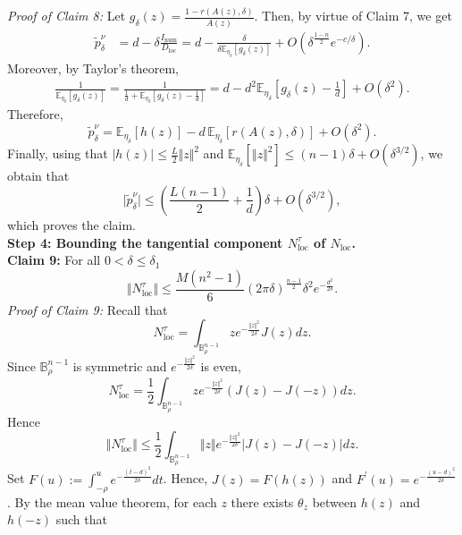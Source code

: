 \documentclass[11pt]{amsart}
\newcommand{\1}{\mathds{1}}
\theoremstyle{definition}
\theoremstyle{remark}
\theoremstyle{definition}
\begin{document}
\emph{Proof of Claim 8:} Let $g_{\delta}(z)=\frac{1-r(A(z),\delta)}{A(z)}$. Then,  by virtue of Claim 7, we get
\begin{equation*}
    \begin{aligned}
      \tilde{p}_{\delta}^{\nu}&=d-\delta \frac{I_{\operatorname{num}}}{D_{\operatorname{loc}}}
      =d- \frac{\delta }{\delta \mathbb{E}_{\eta_{\delta}}[g_{\delta}(z)]}+O(\delta^{\frac{1-n}{2}}e^{-c/\delta}).
    \end{aligned}
\end{equation*}
Moreover, by Taylor's theorem,
\begin{equation*}
    \begin{aligned}
    \frac{1}{\mathbb{E}_{\eta_{\delta}}[g_{\delta}(z)]}=\frac{1}{\frac{1}{d}+\mathbb{E}_{\eta_{\delta}}\left[g_{\delta}(z)-\frac{1}{d}\right]}=d-d^2 \mathbb{E}_{\eta_{\delta}}\left[g_{\delta}(z)-\frac{1}{d}\right]+O(\delta^2).
    \end{aligned}
\end{equation*}
Therefore, 
$$
 \tilde{p}_{\delta}^{\nu}= \mathbb{E}_{\eta_{\delta}}[h(z)]-d\,\mathbb{E}_{\eta_{\delta}}[r(A(z),\delta)]+O(\delta^2).
$$
Finally, using that $\vert h(z)\vert \leq \frac{L}{2}\Vert z\Vert^2$ and $\mathbb{E}_{\eta_{\delta}}[\Vert z\Vert^2]\leq (n-1)\delta +O(\delta^{3/2})$, we obtain that 
$$
\vert \tilde{p}_{\delta}^{\nu}\vert \leq \left(\frac{L(n-1)}{2}+\frac{1}{d}\right)\delta+O(\delta^{3/2}),
$$
which proves the claim.\\
\noindent\textbf{Step 4: Bounding the tangential component $N_{\operatorname{loc}}^{\tau}$ of $N_{\operatorname{loc}}$.}\\
\textbf{Claim 9:} For all $0<\delta \leq \delta_1$
$$
\Vert N_{\operatorname{loc}}^{\tau}\Vert \leq \frac{M(n^2-1)}{6} (2\pi \delta)^{\frac{n-1}{2}} \delta^2 e^{-\frac{d^2}{2\delta}}.
$$
\emph{Proof of Claim 9:} Recall that
$$
N_{\operatorname{loc}}^{\tau}= \int_{\mathbb{B}_{\rho}^{n-1}} ze^{-\frac{\Vert z\Vert^2}{2\delta}}J(z)dz.
$$
Since $\mathbb{B}_{\rho}^{n-1}$ is symmetric and $e^{-\frac{\Vert z\Vert^2}{2\delta}}$ is even, 
$$
N_{\operatorname{loc}}^{\tau}=\frac{1}{2}\int_{\mathbb{B}_{\rho}^{n-1}} ze^{-\frac{\Vert z\Vert^2}{2\delta}} (J(z)-J(-z))dz.
$$
Hence
$$
\Vert N_{\operatorname{loc}}^{\tau}\Vert \leq \frac{1}{2}\int_{\mathbb{B}_{\rho}^{n-1}} \Vert z\Vert e^{-\frac{\Vert z\Vert^2}{2\delta}} \vert J(z)-J(-z)\vert dz.
$$
Set $F(u):=\int_{-\rho}^u e^{-\frac{(t-d)^2}{2\delta}}dt$. Hence, $J(z)=F(h(z))$ and $F^{\prime}(u)=e^{-\frac{(u-d)^2}{2\delta}}$.
By the mean value theorem, for each $z$ there exists $\theta_z$ between $h(z)$ and $h(-z)$ such that
\end{document}
